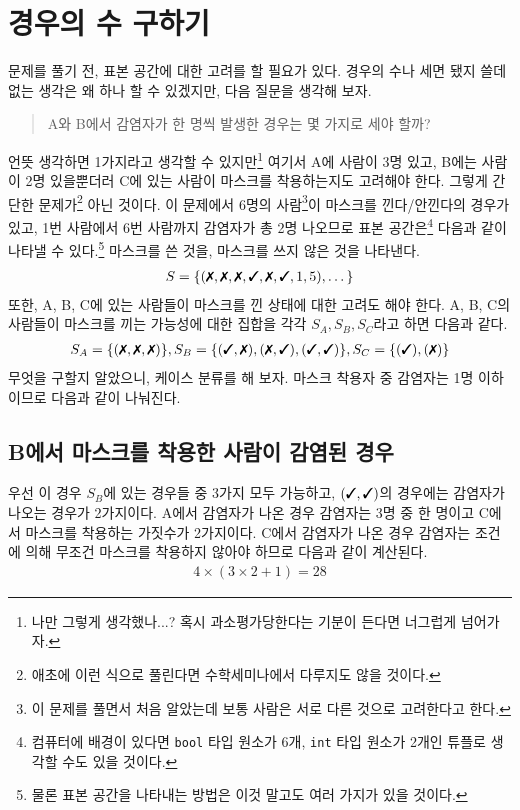 \documentclass{scrartcl}
\newcommand{\cmark}{\ding{51}}
\newcommand{\xmark}{\ding{55}}
\begin{document}
\section{경우의 수 구하기}
문제를 풀기 전, 표본 공간에 대한 고려를 할 필요가 있다. 경우의 수나 세면 됐지 쓸데없는 생각은 왜 하나 할 수 있겠지만, 다음 질문을 생각해 보자.
\begin{quote}
  A와 B에서 감염자가 한 명씩 발생한 경우는 몇 가지로 세야 할까?
\end{quote}
언뜻 생각하면 1가지라고 생각할 수 있지만\footnote{나만 그렇게 생각했나...? 혹시 과소평가당한다는 기분이 든다면 너그럽게 넘어가자.} 여기서 A에 사람이 3명 있고, B에는 사람이 2명 있을뿐더러 C에 있는 사람이 마스크를 착용하는지도 고려해야 한다. 그렇게 간단한 문제가\footnote{애초에 이런 식으로 풀린다면 수학세미나에서 다루지도 않을 것이다.} 아닌 것이다. 이 문제에서 6명의 사람\footnote{이 문제를 풀면서 처음 알았는데 보통 사람은 서로 다른 것으로 고려한다고 한다.}이 마스크를 낀다/안낀다의 경우가 있고, 1번 사람에서 6번 사람까지 감염자가 총 2명 나오므로 표본 공간은\footnote{컴퓨터에 배경이 있다면 \Verb|bool| 타입 원소가 6개, \Verb|int| 타입 원소가 2개인 튜플로 생각할 수도 있을 것이다.} 다음과 같이 나타낼 수 있다.\footnote{물론 표본 공간을 나타내는 방법은 이것 말고도 여러 가지가 있을 것이다.}  마스크를 쓴 것을,  마스크를 쓰지 않은 것을 나타낸다.
\begin{align*}
  S=\{(\text{\xmark}, \text{\xmark}, \text{\xmark}, \text{\cmark}, \text{\xmark}, \text{\cmark}, 1, 5),\dots\}
\end{align*}
또한, A, B, C에 있는 사람들이 마스크를 낀 상태에 대한 고려도 해야 한다. A, B, C의 사람들이 마스크를 끼는 가능성에 대한 집합을 각각 \(S_A, S_B, S_C\)라고 하면 다음과 같다.
\begin{align*}
  S_A=\{(\text{\xmark}, \text{\xmark}, \text{\xmark})\}, S_B=\{(\text{\cmark}, \text{\xmark}), (\text{\xmark}, \text{\cmark}), (\text{\cmark}, \text{\cmark})\}, S_C=\{(\text{\cmark}), (\text{\xmark})\}
\end{align*}
무엇을 구할지 알았으니, 케이스 분류를 해 보자. 마스크 착용자 중 감염자는 1명 이하이므로 다음과 같이 나눠진다.

\subsection{B에서 마스크를 착용한 사람이 감염된 경우}
우선 이 경우 \(S_B\)에 있는 경우들 중 3가지 모두 가능하고, \((\text{\cmark}, \text{\cmark})\)의 경우에는 감염자가 나오는 경우가 2가지이다. A에서 감염자가 나온 경우 감염자는 3명 중 한 명이고 C에서 마스크를 착용하는 가짓수가 2가지이다. C에서 감염자가 나온 경우 감염자는 조건에 의해 무조건 마스크를 착용하지 않아야 하므로 다음과 같이 계산된다.
\begin{align*}
  4\times(3\times 2+1)=28
\end{align*}
\end{document}
